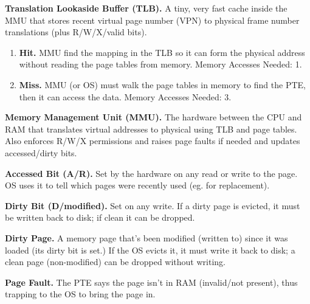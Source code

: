\documentclass[12pt]{article}
\begin{document}
{\bf Translation Lookaside Buffer (TLB).} {A tiny, very fast cache inside the MMU that stores recent virtual page number (VPN) to physical frame number translations (plus R/W/X/valid bits).} \par
\begin{enumerate}
        \item[]{\bf Hit.} {MMU find the mapping in the TLB so it can form the physical address without reading the page tables from memory. Memory Accesses Needed: 1.}
        \item[]{\bf Miss.} {MMU (or OS) must walk the page tables in memory to find the PTE, then it can access the data. Memory Accesses Needed: 3. } 
\end{enumerate}

{\bf Memory Management Unit (MMU).} {The hardware between the CPU and RAM that translates virtual addresses to physical using TLB and page tables. Also enforces R/W/X permissions and raises page faults if needed and updates accessed/dirty bits.} \par

{\bf Accessed Bit (A/R).} {Set by the hardware on any read or write to the page. OS uses it to tell which pages were recently used (eg. for replacement).}

{\bf Dirty Bit (D/modified).} {Set on any write. If a dirty page is evicted, it must be written back to disk; if clean it can be dropped.}

{\bf Dirty Page.} {A memory page that's been modified (written to) since it was loaded (its dirty bit is set.) If the OS evicts it, it must write it back to disk; a clean page (non-modified) can be dropped without writing.}

{\bf Page Fault.} {The PTE says the page isn't in RAM (invalid/not present), thus trapping to the OS to bring the page in.}
\end{document}
